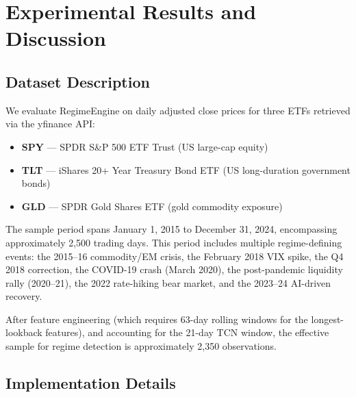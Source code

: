 \section{Experimental Results and Discussion}
\label{sec:experiments}

\subsection{Dataset Description}

We evaluate RegimeEngine on daily adjusted close prices for three ETFs retrieved via the yfinance API:

\begin{itemize}
    \item \textbf{SPY} --- SPDR S\&P 500 ETF Trust (US large-cap equity)
    \item \textbf{TLT} --- iShares 20+ Year Treasury Bond ETF (US long-duration government bonds)
    \item \textbf{GLD} --- SPDR Gold Shares ETF (gold commodity exposure)
\end{itemize}

The sample period spans January 1, 2015 to December 31, 2024, encompassing approximately 2,500 trading days. This period includes multiple regime-defining events: the 2015--16 commodity/EM crisis, the February 2018 VIX spike, the Q4 2018 correction, the COVID-19 crash (March 2020), the post-pandemic liquidity rally (2020--21), the 2022 rate-hiking bear market, and the 2023--24 AI-driven recovery.

After feature engineering (which requires 63-day rolling windows for the longest-lookback features), and accounting for the 21-day TCN window, the effective sample for regime detection is approximately 2,350 observations.

\subsection{Implementation Details}

